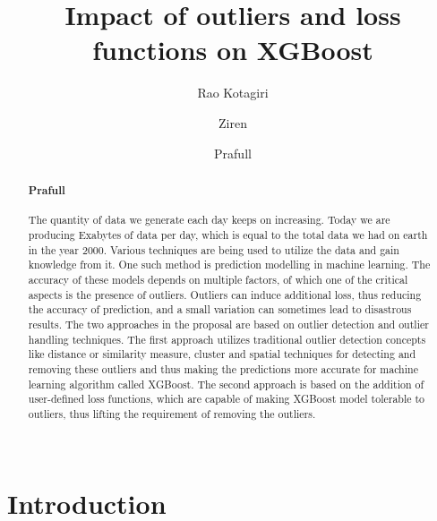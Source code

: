 \documentclass[runningheads]{llncs}
\begin{document}
%
\title{Impact of outliers and loss functions on XGBoost}

%
%
\author{Rao Kotagiri \and
Ziren \and
Prafull}
%
%
%
\maketitle              %
%
\begin{abstract}
\paragraph{Prafull} The quantity of data we generate each day keeps on increasing. Today we are producing Exabytes of data per day, which is equal to the total data we had on earth in the year 2000. Various techniques are being used to utilize the data and gain knowledge from it. One such method is prediction modelling in machine learning. The accuracy of these models depends on multiple factors, of which one of the critical aspects is the presence of outliers. Outliers can induce additional loss, thus reducing the accuracy of prediction, and a small variation can sometimes lead to disastrous results. The two approaches in the proposal are based on outlier detection and outlier handling techniques. The first approach utilizes traditional outlier detection concepts like distance or similarity measure, cluster and spatial techniques for detecting and removing these outliers and thus making the predictions more accurate for machine learning algorithm called XGBoost. The second approach is based on the addition of user-defined loss functions, which are capable of making XGBoost model tolerable to outliers, thus lifting the requirement of removing the outliers. \\
\\


\end{abstract}
%
%
%
\section{Introduction}
\end{document}
